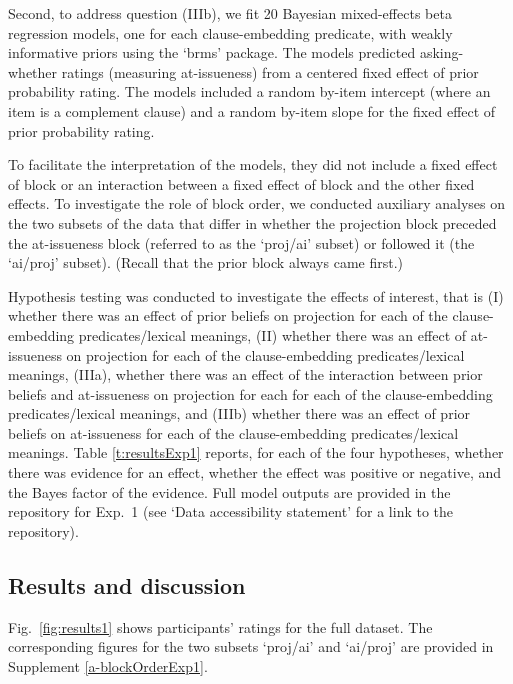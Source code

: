 \documentclass[11pt,fleqn]{article}
\newcommand{\6}{\mbox{$[\hspace*{-.6mm}[$}}
\newcommand{\9}{\mbox{$]\hspace*{-.6mm}]$}}
\begin{document}
Second, to address question (IIIb), we fit 20 Bayesian mixed-effects beta regression models, one for each clause-embedding predicate, with weakly informative priors using the `brms' package. The models predicted asking-whether ratings (measuring at-issueness) from a centered fixed effect of prior probability rating. The models included a random by-item intercept (where an item is a complement clause) and a random by-item slope for the fixed effect of prior probability rating.

To facilitate the interpretation of the models, they did not include a fixed effect of block or an interaction between a fixed effect of block and the other fixed effects. To investigate the role of block order, we conducted auxiliary analyses on the two subsets of the data that differ in whether the projection block preceded the at-issueness block (referred to as the `proj/ai' subset) or followed it (the `ai/proj' subset). (Recall that the prior block always came first.) 

Hypothesis testing was conducted to investigate the effects of interest, that is (I) whether there was an effect of prior beliefs on projection for each of the clause-embedding predicates/lexical meanings, (II) whether there was an effect of at-issueness on projection for each of the clause-embedding predicates/lexical meanings, (IIIa), whether there was an effect of the interaction between prior beliefs and at-issueness on projection for each  for each of the clause-embedding predicates/lexical meanings, and (IIIb) whether there was an effect of prior beliefs on at-issueness for each of the clause-embedding predicates/lexical meanings. Table \ref{t:resultsExp1} reports, for each of the four hypotheses, whether there was evidence for an effect, whether the effect was positive or negative, and the Bayes factor of the evidence. Full model outputs are provided in the repository for Exp.~1 (see `Data accessibility statement' for a link to the repository). 

\subsection{Results and discussion}\label{s-results-exp1}

Fig.~\ref{fig:results1} shows participants' ratings for the full dataset. The corresponding figures for the two subsets `proj/ai' and `ai/proj' are provided in Supplement \ref{a-blockOrderExp1}.
\end{document}
